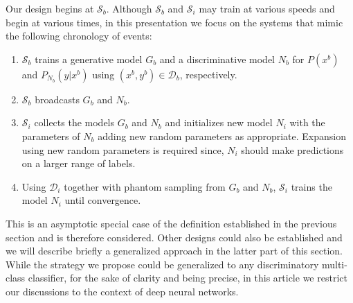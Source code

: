 \documentclass[10pt,twocolumn,letterpaper]{article}
\def \cS{{\mathcal{S}}}
\def \cD{{\mathcal{D}}}
\begin{document}
	Our design begins at $\cS_b$. 
	Although $\cS_b$ and $\cS_i$ may train at various speeds and begin at various times, in this presentation we focus on the systems that mimic the following chronology of events:
	\begin{enumerate}
		\item $\cS_b$ trains a generative model $G_b$ and a discriminative model $N_b$  for $P(x^b)$ and $P_{N_b}(y \vert x^b)$ using $(x^b,y^b) \in \cD_b$, respectively.
		\item $\cS_b$ broadcasts $G_b$ and $N_b$.
		\item $\cS_i$ collects the models $G_b$ and $N_b$ and initializes new model $N_i$ with the parameters of $N_b$ adding new random parameters as appropriate. 
		Expansion using new random parameters is required since, $N_i$ should make predictions on a larger range of labels.
		\item Using $\cD_i$ together with phantom sampling from $G_b$ and $N_b$, $\cS_i$ trains the model $N_i$ until convergence.
	\end{enumerate} 
	This is an asymptotic special case of the definition established in the previous section and is therefore considered. 
	Other designs could also be established and we will describe briefly a generalized approach in the latter part of this section. 
	While the strategy we propose could be generalized to any discriminatory multi-class classifier, for the sake of clarity and being precise, in this article we restrict our discussions to the context of deep neural networks. 
	
\end{document}
